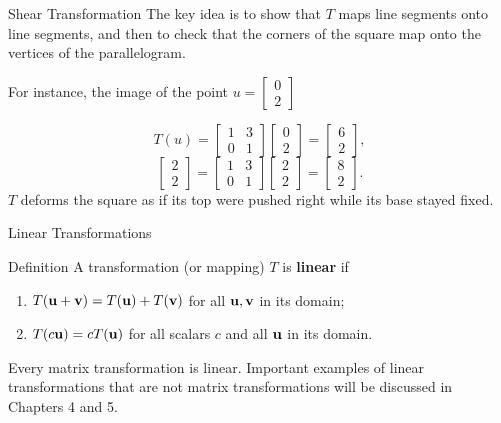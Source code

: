 \begin{frame}{Shear Transformation}
The key idea is to show that $T$ maps line segments onto line segments, and then to check that the
corners of the square map onto the vertices of the parallelogram.

For instance, the image of the point $u = \begin{bmatrix}0\\2\end{bmatrix}$

\[
T(u)
=\begin{bmatrix}1&3\\0&1\end{bmatrix}\begin{bmatrix}0\\2\end{bmatrix}
=\begin{bmatrix}6\\2\end{bmatrix},
\]
\small{
\[
\begin{bmatrix}2\\2\end{bmatrix}
=\begin{bmatrix}1&3\\0&1\end{bmatrix}\begin{bmatrix}2\\2\end{bmatrix}
=\begin{bmatrix}8\\2\end{bmatrix}.
\]}
$T$ deforms the square as if its top were pushed right while its base stayed fixed.
\end{frame}

\begin{frame}{Linear Transformations}
\begin{block}{Definition}
A transformation (or mapping) $T$ is \textbf{linear} if
\begin{enumerate}
\item $T(\mathbf{u}+\mathbf{v})=T(\mathbf{u})+T(\mathbf{v})$ for all $\mathbf{u},\mathbf{v}$ in its domain;
\item $T(c\mathbf{u})=cT(\mathbf{u})$ for all scalars $c$ and all $\mathbf{u}$ in its domain.
\end{enumerate}
\end{block}
Every matrix transformation is linear. Important examples of linear transformations that are not matrix transformations will be discussed in Chapters 4 and 5.
\end{frame}

